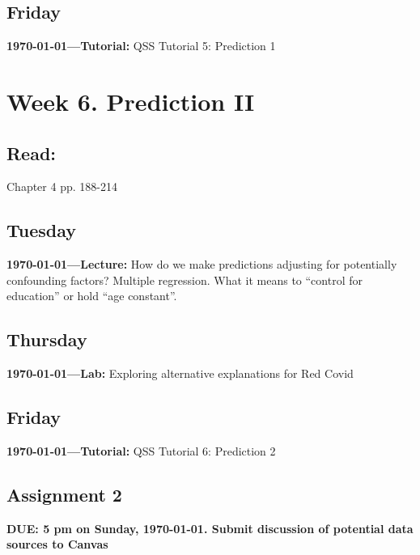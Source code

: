 \AdvanceDate[1]
\subsection{Friday} \textbf{\today---Tutorial:} QSS Tutorial 5: Prediction 1
\AdvanceDate[4]




\vspace{2em}

\section{Week 6. Prediction II}


\subsection{Read:}

\citet{Imai2022-pm} Chapter 4 pp. 188-214


\subsection{Tuesday} \textbf{\today---Lecture:} How do we make predictions adjusting for potentially confounding factors? Multiple regression. What it means to ``control for education'' or hold ``age constant''. 

\AdvanceDate[2]

\subsection{Thursday} \textbf{\today---Lab:} Exploring alternative explanations for Red Covid

\AdvanceDate[1]
\subsection{Friday} \textbf{\today---Tutorial:} QSS Tutorial 6: Prediction 2
\AdvanceDate[2]

\vspace{2em}

\subsection{Assignment 2} \textbf{DUE: 5 pm on Sunday, \today. Submit discussion of potential data sources to Canvas}

\AdvanceDate[2]

\vspace{2em}


